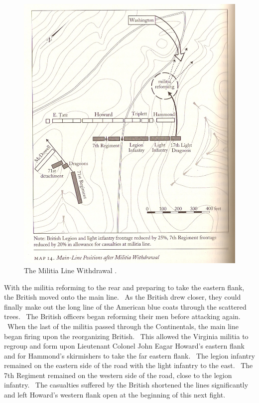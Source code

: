 \begin{figure}[ht]
    \begin{center}
    \includegraphics[width=\textwidth]{gfx/beiber06}
    \end{center}
    \caption{The Militia Line Withdrawal \cite[96]{babits_devil_2001}.}
    \label{beiber06}
\end{figure}

With the militia reforming to the rear and preparing to take the eastern flank,
the British moved onto the main line.  As the British drew closer, they could
finally make out the long line of the American blue coats through the scattered
trees.  The British officers began reforming their men before attacking again.
 When the last of the militia passed through the Continentals, the main line
began firing upon the reorganizing British.  This allowed the Virginia militia
to regroup and form upon Lieutenant Colonel John Eagar Howard’s eastern flank
and for Hammond’s skirmishers to take the far eastern flank.  The legion
infantry remained on the eastern side of the road with the light infantry to the
east.  The 7th Regiment remained on the western side of the road, close to the
legion infantry.  The casualties suffered by the British shortened the lines
significantly and left Howard’s western flank open at the beginning of this next
fight.  


